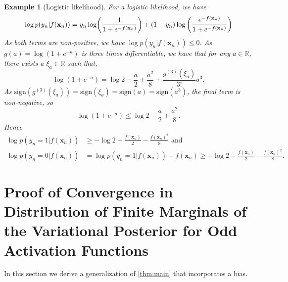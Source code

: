 \documentclass[twoside]{article}
\newcommand{\vnull}{\mathbf{0}}
\newcommand{\vx}{\mathbf{x}}
\newcommand{\Q}{\mathbb{Q}}
\renewcommand{\Q}{\ensuremath{Q}}
\newcommand{\R}{\mathbb{R}}
\DeclarePairedDelimiter\parens{(}{)}             %
\theoremstyle{theoremstyle}
\newtheorem{example}[theorem]{Example}
\begin{document}
\begin{example}[Logistic likelihood]
    For a logistic likelihood, we have
    \begin{equation}
        \log p(y_n
        |f(\vx_n)) = y_n\log\parens*{\frac{1}{1+e^{-f(\vx_n)}}} + (1-y_n)
       \log\left(\frac{e^{-f(\vx_n)}}{1+e^{-f(\vx_n)}}\right)
    \end{equation}
    As both terms are non-positive, we have $        \log p(y_n
        |f(\vx_n))\leq 0$. 
    As $g(a)=\log(1+e^{-a})$ is three times differentiable, we have that for any $a \in \R$, there exists a $\xi_a \in \R$ such that,
    \begin{equation}
        \log(1+e^{-a}) = \log 2 - \frac{a}{2} + \frac{a^2}{8} + \frac{g^{(3)}(\xi_a)}{3!}a^3.
    \end{equation}
    As $\mathrm{sign}(g^{(3)}(\xi_a)) = \mathrm{sign}(\xi_a) =\mathrm{sign}(a) = \mathrm{sign}(a^3)$, the final term is non-negative, so
    \begin{equation}
        \log(1+e^{-a}) \leq \log 2 - \frac{a}{2} + \frac{a^2}{8}.
    \end{equation}
    Hence
    \begin{align}
        \log p(y_n=1
        |f(\vx_n)) &\geq -\log 2 + \frac{f(\vx_n) }{2}-\frac{f(\vx_n) ^2}{8} \text{ and} \\
        \log p(y_n=0
        |f(\vx_n)) &=     \log p(y_n=1
        |f(\vx_n))-f(\vx_n) \geq -\log 2 -\frac{f(\vx_n) }{2}-\frac{f(\vx_n) ^2}{8}.
    \end{align}
\end{example}


\section{Proof of Convergence in Distribution of Finite Marginals of the Variational Posterior for Odd Activation Functions}\label{app:convergence-in-dist}

In this section we derive a generalization of \cref{thm:main} that incorporates a bias.
\end{document}
